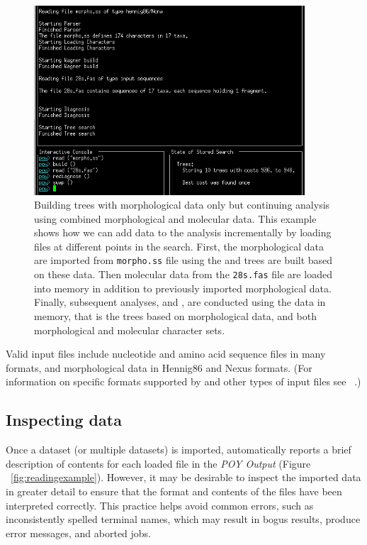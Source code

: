{\begin{figure}[]
    \begin{center}
        \includegraphics[width=0.9\textwidth]{doc/figures/reading_example2.jpg}
    \end{center}
    \caption{Building trees with morphological data only but continuing analysis using combined morphological and 
    molecular data. This example shows how we can add data to the analysis incrementally by loading files at different 
    points in the search. First, the morphological data are imported from \texttt{morpho.ss} file using  
    the and trees are built based on these data. Then molecular data from the \texttt{28s.fas} file are loaded into memory in 
    addition to previously imported morphological data. Finally, subsequent analyses,  and 
    , are conducted using the data in memory, that is the trees based on morphological data, and 
    both morphological and molecular character sets.}
    \label{fig:reading_example2}
\end{figure}

Valid input files include nucleotide and amino acid sequence files in many formats,
and morphological data in Hennig86 and Nexus formats. (For information on specific formats supported by \poy and 
other types of input files see ~.)

\subsection{Inspecting data}

Once a dataset (or multiple datasets) is imported, \poy automatically reports a brief description of contents for each loaded 
file in the \emph{POY Output} (Figure ~\ref{fig:readingexample}). However, it may be desirable to inspect the imported 
data in greater detail to ensure that the format and contents of the files have been interpreted correctly. This practice helps 
avoid common errors, such as inconsistently spelled terminal names, which may result in bogus results, produce error 
messages, and aborted jobs.

}
